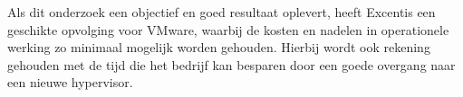 Als dit onderzoek een objectief en goed resultaat oplevert, heeft Excentis een geschikte opvolging voor VMware, waarbij de kosten en nadelen in operationele werking zo minimaal mogelijk worden gehouden.
Hierbij wordt ook rekening gehouden met de tijd die het bedrijf kan besparen door een goede overgang naar een nieuwe hypervisor.



